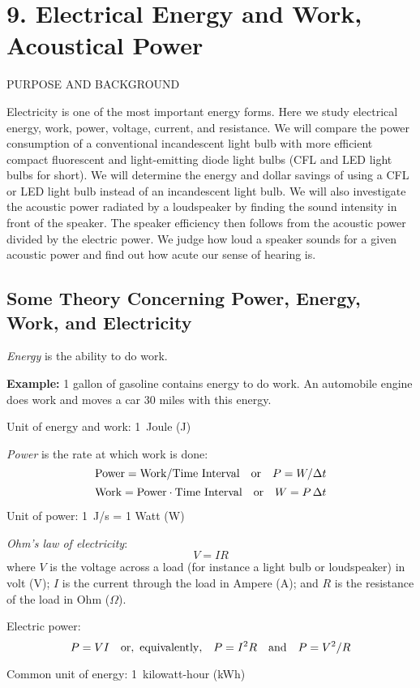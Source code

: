 \documentclass[11pt]{NSF}
\def\be{\begin{equation}}
\def\ee{\end{equation}}
\begin{document}
     
\section{9. Electrical Energy and Work, Acoustical Power}

PURPOSE AND BACKGROUND

Electricity is one of the most important energy forms. 
Here we study electrical energy, work, power, voltage, current,
and resistance. 
We will compare the power consumption of a conventional
incandescent light bulb with more efficient 
compact fluorescent and light-emitting diode light bulbs
(CFL and LED light bulbs for short).
We will determine the energy and dollar savings of using a CFL 
or LED light bulb instead of an incandescent light bulb. 
We will also investigate the acoustic power radiated by
a loudspeaker by finding the sound intensity in front of
the speaker. 
The speaker efficiency then follows from the acoustic power 
divided by the electric power. 
We judge how loud a speaker sounds for a given acoustic power 
and find out how acute our sense of hearing is.

\subsection{Some Theory Concerning Power, Energy, Work, and
Electricity}

{\em Energy} is the ability to do work.

{\bf Example:} 1 gallon of gasoline contains energy to do work. An
automobile engine does work and moves a car 30 miles with this energy.

Unit of energy and work: 1~Joule (J)

{\em Power} is the rate at which work is done:
%
\be
{\rm Power} = {\rm Work/Time~Interval}
\quad{\rm or}\quad
P = W/\Delta t
\ee
%
\be
{\rm Work} = {\rm Power}\cdot{\rm Time~Interval}
\quad{\rm or}\quad
W = P\,\Delta t
\ee

Unit of power: 1~J/s = 1 Watt (W)

{\em Ohm's law of electricity}:
%
\be
V=IR
\ee
%
where
$V$ is the voltage across a load
(for instance a light bulb or loudspeaker) in volt (V); 
$I$ is the current through the load in Ampere (A); and
$R$ is the resistance of the load in Ohm ($\Omega$).

Electric power:
\be
P = VI\quad{\rm or,\ equivalently,}\quad
P = I^2 R\quad{\rm and}\quad 
P = V^2/R
\ee

Common unit of energy: 1~kilowatt-hour (kWh)
\end{document}
